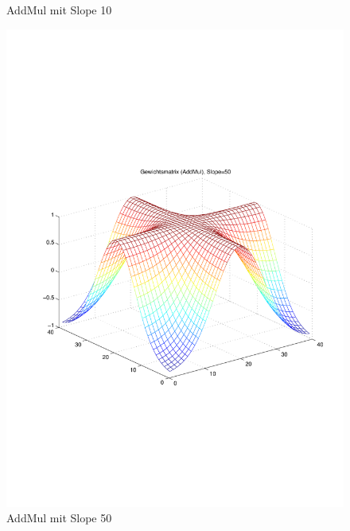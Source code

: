 \begin{figure}[hbt]
\begin{minipage}{0.45\textwidth}
		\caption{AddMul mit Slope 10}
		\label{AddMul210}
	\end{minipage}
	\hfill
	\begin{minipage}{0.45\textwidth}
		\includegraphics[trim=70 200 32 242, clip, width=\textwidth]{./Bilder/Auswertung/Gewichtsmatrix/Gewichtsmatrix_AddMul_Slope_50}
		\caption{AddMul mit Slope 50}
		\label{AddMul50}
	\end{minipage}
\end{figure}
